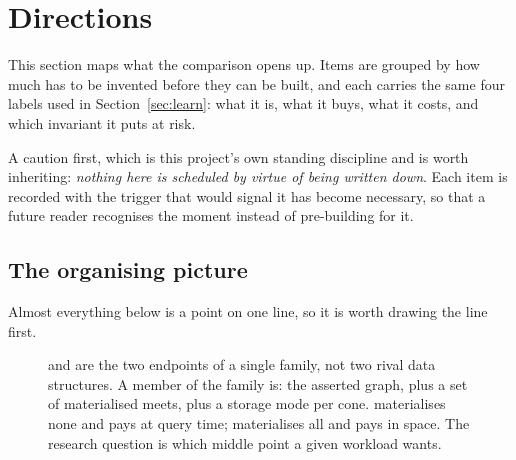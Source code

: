 \section{Directions}
\label{sec:directions}

This section maps what the comparison opens up. Items are grouped by how much
has to be invented before they can be built, and each carries the same four
labels used in Section~\ref{sec:learn}: what it is, what it buys, what it
costs, and which invariant it puts at risk.

A caution first, which is this project's own standing discipline and is worth
inheriting: \emph{nothing here is scheduled by virtue of being written down}.
Each item is recorded with the trigger that would signal it has become
necessary, so that a future reader recognises the moment instead of
pre-building for it.

\subsection{The organising picture}

Almost everything below is a point on one line, so it is worth drawing the
line first.

\begin{figure}[h]
\centering
{}
\caption{\odag{} and \fca{} are the two endpoints of a single family, not two
rival data structures. A member of the family is: the asserted graph, plus a
set of materialised meets, plus a storage mode per cone. \odag{} materialises
none and pays at query time; \fca{} materialises all and pays in space. The
research question is which middle point a given workload wants.}
\label{fig:spectrum}
\end{figure}

